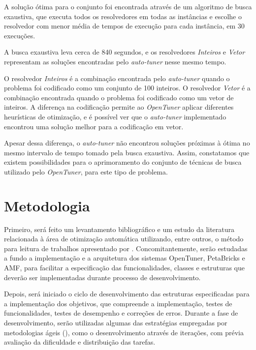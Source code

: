 \documentclass[a4paper, 12pt]{article}
\begin{document}
A solução ótima para o conjunto foi encontrada através de um algoritmo de busca
exaustiva, que executa todos os resolvedores em todas as instâncias e escolhe
o resolvedor com menor média de tempos de execução para cada instância, em 30
execuções.

A busca exaustiva leva cerca de 840 segundos, e os resolvedores
\textit{Inteiros} e \textit{Vetor} representam as soluções encontradas pelo
\emph{auto-tuner} nesse mesmo tempo.

O resolvedor \textit{Inteiros} é a
combinação encontrada pelo \emph{auto-tuner} quando o problema foi codificado
como um conjunto de 100 inteiros. O resolvedor \textit{Vetor} é a combinação
encontrada quando o problema foi codificado como um vetor de inteiros. A
diferença na codificação permite ao \emph{OpenTuner} aplicar diferentes
heurísticas de otimização, e é possível ver que o \emph{auto-tuner}
implementado encontrou uma solução melhor para a codificação em vetor.

Apesar dessa diferença, o \emph{auto-tuner} não encontrou soluções
próximas à ótima no mesmo intervalo de tempo tomado pela busca exaustiva.
Assim, constatamos que existem possibilidades para o aprimoramento do conjunto
de técnicas de busca utilizado pelo \emph{OpenTuner}, para este tipo 
de problema.

\section{Metodologia} \label{sec:met}

Primeiro, será feito um levantamento bibliográfico e um estudo da literatura
relacionada à área de otimização automática utilizando, entre outros, o método
para leitura de trabalhos apresentado por \citet{keshav2007howtoread}.
Concomitantemente, serão  estudadas a fundo a implementação e a arquitetura dos
sistemas OpenTuner, PetaBricks e AMF, para facilitar a especificação das
funcionalidades, classes e estruturas que deverão ser implementadas durante
processo de desenvolvimento.

Depois, será iniciado o ciclo de desenvolvimento das estruturas especificadas
para a implementação dos objetivos, que compreende a implementação,
testes de funcionalidades, testes de desempenho e correções de erros.
Durante a fase de desenvolvimento, serão utilizadas algumas das estratégias
empregadas por metodologias ágeis (\citet{beck2000extreme}), como o
desenvolvimento através de iterações, com prévia avaliação da dificuldade e
distribuição das tarefas.
\end{document}
